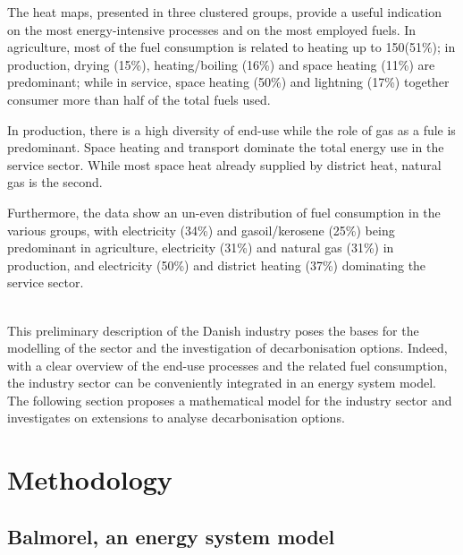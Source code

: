 \documentclass[review]{elsarticle}
\begin{document}
The heat maps, presented in three clustered groups, provide a useful indication on the most energy-intensive processes and on the most employed fuels. 
In agriculture, most of the fuel consumption is related to heating up to 150\textdegree (51\%); in production, drying (15\%), heating/boiling (16\%) and space heating (11\%) are predominant; while in service, space heating (50\%) and lightning (17\%) together consumer more than half of the total fuels used.

In production, there is a high diversity of end-use while the role of gas as a fule is predominant. 
Space heating and transport dominate the total energy use in the service sector. While most space heat already supplied by district heat, natural gas is the second.

Furthermore, the data show an un-even distribution of fuel consumption in the various groups, with electricity (34\%) and gasoil/kerosene (25\%) being predominant in agriculture, electricity (31\%) and natural gas (31\%) in production, and electricity (50\%) and district heating (37\%) dominating the service sector.

\\
This preliminary description of the Danish industry poses the bases for the modelling of the sector and the investigation of decarbonisation options. Indeed, with a clear overview of the end-use processes and the related fuel consumption, the industry sector can be conveniently integrated in an energy system model. 
The following section proposes a mathematical model for the industry sector and investigates on extensions to analyse decarbonisation options. 




\section{Methodology} \label{meths}

\subsection{Balmorel, an energy system model}
\end{document}
